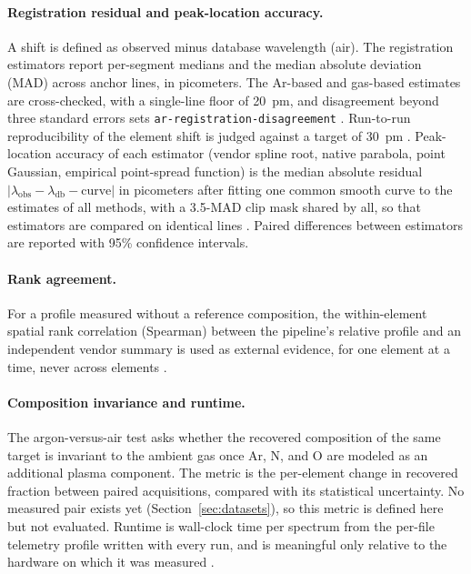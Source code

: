 \paragraph{Registration residual and peak-location accuracy.}
A shift is defined as observed minus database wavelength (air). The registration estimators report per-segment medians and the median absolute deviation (MAD) across anchor lines, in picometers. The Ar-based and gas-based estimates are cross-checked, with a single-line floor of \SI{20}{\pico\metre}, and disagreement beyond three standard errors sets \texttt{ar-registration-disagreement} %
. Run-to-run reproducibility of the element shift is judged against a target of \SI{30}{\pico\metre} %
. Peak-location accuracy of each estimator (vendor spline root, native parabola, point Gaussian, empirical point-spread function) is the median absolute residual $|\lambda_\mathrm{obs}-\lambda_\mathrm{db}-\text{curve}|$ in picometers after fitting one common smooth curve to the estimates of all methods, with a 3.5-MAD clip mask shared by all, so that estimators are compared on identical lines %
. Paired differences between estimators are reported with 95\% confidence intervals.

\paragraph{Rank agreement.}
For a profile measured without a reference composition, the within-element spatial rank correlation (Spearman) between the pipeline's relative profile and an independent vendor summary is used as external evidence, for one element at a time, never across elements %
.

\paragraph{Composition invariance and runtime.}
The argon-versus-air test asks whether the recovered composition of the same target is invariant to the ambient gas once Ar, N, and O are modeled as an additional plasma component. The metric is the per-element change in recovered fraction between paired acquisitions, compared with its statistical uncertainty. No measured pair exists yet (Section~\ref{sec:datasets}), so this metric is defined here but not evaluated. Runtime is wall-clock time per spectrum from the per-file telemetry profile written with every run, and is meaningful only relative to the hardware on which it was measured %
.

